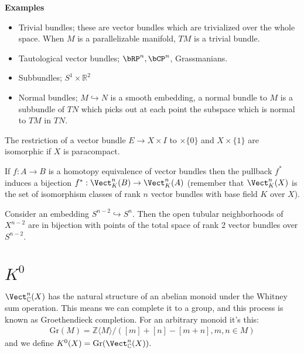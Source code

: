 \documentclass[11pt, raggedright]{tufte-book}
\begin{document}
\textbf{Examples}

\begin{itemize}
  \item Trivial bundles; these are vector bundles which are trivialized over the whole space. When $M$ is a parallelizable manifold, $TM$ is a trivial bundle. 
  \item Tautological vector bundles; $\bRP^n, \bCP^n$, Grassmanians.
  \item Subbundles; $S^1 \times \mathbb R^2$
  \item Normal bundles; $M\hookrightarrow N$ is a smooth embedding, a normal bundle to $M$ is a subbundle of $TN$ which picks out at each point the subspace which is normal to $TM$ in $TN$.
\end{itemize}

\begin{lem}\label{lem:vb-over-XxI}
  The restriction of a vector bundle $E\to X\times I$ to $\times \{0\}$ and $X\times \{1\}$ are isomorphic if $X$ is paracompact.
\end{lem}
\begin{cor}\label{cor:homotopies-of-vb}
  If $f:A\to B$ is a homotopy equivalence of vector bundles then the pullback $f^*$ induces a bijection $f^*:\Vect_K^n(B) \to \Vect_K^n(A)$ (remember that $\Vect^n_K(X)$ is the set of isomorphism classes of rank $n$ vector bundles with base field $K$ over $X$).
\end{cor}
\begin{example}
  Consider an embedding $S^{n-2}\hookrightarrow S^n$. Then the open tubular neighborhoods of $X^{n-2}$ are in bijection with points of the total space of rank 2 vector bundles over $S^{n-2}$.
\end{example}

\section{$K^0$}

$\Vect_{\mathbb C}^n(X)$ has the natural structure of an abelian monoid under the Whitney sum operation. This means we can complete it to a group, and this process is known as Groethendieck completion. For an arbitrary monoid it's this:
\begin{align*}
  \text{Gr}(M) = \mathbb Z \langle M \rangle / ([m] + [n] - [m + n], m,n \in M)
\end{align*}
and we define $K^0(X) = \operatorname{Gr}(\Vect^n_{\mathbb C}(X))$.
\end{document}
